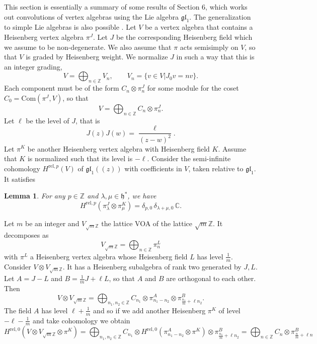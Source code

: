 \documentclass[a4paper, reqno]{amsart}
\newtheorem{lemma}[theorem]{Lemma}
\theoremstyle{introTheorems}
\renewcommand{\1}{\mathbbold{1}}
\begin{document}
This section is essentially a summary of some results of \cite{CGNS} Section 6, which works out convolutions of vertex algebras using the Lie algebra $\mathfrak{gl}_1$. The generalization to simple Lie algebras is also possible \cite{CLNS}.
Let $V$ be a vertex algebra that contains a Heisenberg vertex algebra $\pi^J$. Let $J$ be the corresponding Heisenberg field which we assume to be non-degenerate. 
We also assume that $\pi$ acts semisimply on $V$, so that $V$ is graded by Heisenberg weight. We normalize $J$ in such a way that this is an integer grading, 
\[
V = \bigoplus_{n \in \mathbb Z} V_n, \qquad V_n = \{ v \in V | J_0v =nv \}.
\]
Each component must be of the form $C_n  \otimes \pi^J_n$ for some module for the coset $C_0 = \text{Com}(\pi^J, V)$, so that
\[
V = \bigoplus_{n \in \mathbb Z} C_n  \otimes \pi^J_n.
\]
Let $\ell$ be the level of $J$, that is 
\[
J(z)J(w) = \frac{\ell}{(z-w)^2}.
\]
Let $\pi^K$ be another Heisenberg vertex algebra with Heisenberg field $K$. Assume that $K$ is normalized such that its level is $-\ell$. 
Consider the semi-infinite cohomology $H^{\mathrm{rel},p}(V)$ of $\mathfrak{gl}_1((z))$ with coefficients in $V$, taken relative to $\mathfrak{gl}_1$. 
It satisfies 
\begin{lemma} \cites{FGZ, CFL} \label{lem:vanish}
For any $p \in \mathbb{Z}$ and $\lambda, \mu \in \mathfrak h^*$, we have
\[
H^{\mathrm{rel},p}(\pi^{J}_\lambda \otimes \pi^{K}_\mu)
   = \delta_{p,0} \, \delta_{\lambda+\mu,0} \, 
     \mathbb{C}.
\]
\end{lemma}
Let $m$ be an integer and $V_{\sqrt{m}\mathbb Z}$ the lattice VOA of the lattice $\sqrt{m}\mathbb Z$. It decomposes as
\[
V_{\sqrt{m}\mathbb Z} = \bigoplus_{n \in \mathbb Z} \pi^L_n 
\]
with $\pi^L$ a Heisenberg vertex algebra whose Heisenberg field $L$ has level $\frac{1}{m}$.
Consider $V \otimes V_{\sqrt{m}\mathbb Z}$. It has a Heisenberg subalgebra of rank two generated by $J, L$. Let $A = J - L$ and $B =\frac{1}{m}J + \ell L$, so that $A$ and $B$ are orthogonal to each other. Then 
\[
V \otimes V_{\sqrt{m}\mathbb Z} = \bigoplus_{n_1, n_2 \in \mathbb Z} C_{n_1} \otimes \pi^A_{n_1 - n_2} \otimes \pi^B_{\frac{n_1}{m} + \ell n_2}. 
\]
The field $A$ has level $\ell + \frac{1}{m}$ and so if we add another Heisenberg $\pi^K$ of level $-\ell - \frac{1}{m}$ and take cohomology we obtain
\[
H^{\mathrm{rel},0}(V \otimes V_{\sqrt{m}\mathbb Z} \otimes \pi^{K}) =
\bigoplus_{n_1, n_2 \in \mathbb Z} C_{n_1} \otimes H^{\mathrm{rel},0}(\pi^A_{n_1 - n_2} \otimes \pi^{K}) \otimes \pi^B_{\frac{n_1}{m} + \ell n_2} = 
\bigoplus_{n\in \mathbb Z} C_{n} \otimes \pi^B_{\frac{n}{m} + \ell n}
\]
\end{document}
